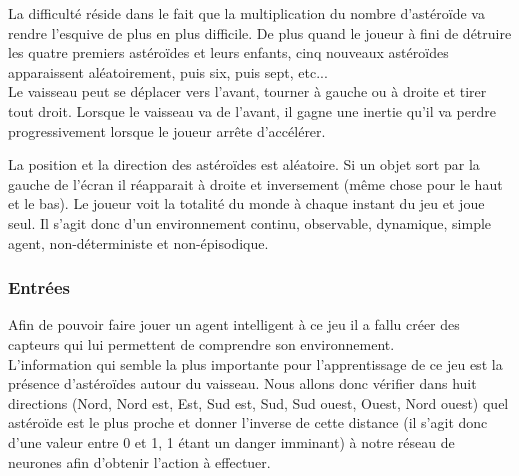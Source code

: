 \documentclass{article}
\begin{document}
La difficulté réside dans le fait que la multiplication du nombre d'astéroïde va rendre l'esquive de plus en plus difficile. De plus quand le joueur à fini de détruire les quatre premiers astéroïdes et leurs enfants, cinq nouveaux astéroïdes apparaissent aléatoirement, puis six, puis sept, etc...\\

Le vaisseau peut se déplacer vers l'avant, tourner à gauche ou à droite et tirer tout droit. Lorsque le vaisseau va de l'avant, il gagne une inertie qu'il va perdre progressivement lorsque le joueur arrête d'accélérer.

La position et la direction des astéroïdes est aléatoire. Si un objet sort par la gauche de l'écran il réapparait à droite et inversement (même chose pour le haut et le bas). Le joueur voit la totalité du monde à chaque instant du jeu et joue seul. Il s'agit donc d'un environnement continu, observable, dynamique, simple agent, non-déterministe et non-épisodique.\\

\subsubsection{Entrées}

Afin de pouvoir faire jouer un agent intelligent à ce jeu il a fallu créer des capteurs qui lui permettent de comprendre son environnement.\\

L'information qui semble la plus importante pour l'apprentissage de ce jeu est la présence d'astéroïdes autour du vaisseau. Nous allons donc vérifier dans huit directions (Nord, Nord est, Est, Sud est, Sud, Sud ouest, Ouest, Nord ouest) quel astéroïde est le plus proche et donner l'inverse de cette distance (il s'agit donc d'une valeur entre 0 et 1, 1 étant un danger imminant) à notre réseau de neurones afin d'obtenir l'action à effectuer.\\
\end{document}
